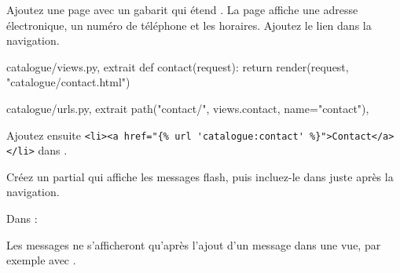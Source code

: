 \begin{exercice}
Ajoutez une page  avec un gabarit qui étend . La
page affiche une adresse électronique, un numéro de téléphone et les horaires.
Ajoutez le lien dans la navigation.
\end{exercice}

\begin{correction}
\begin{codebox}[python]{catalogue/views.py, extrait}
def contact(request):
    return render(request, "catalogue/contact.html")
\end{codebox}

\begin{codebox}[python]{catalogue/urls.py, extrait}
path("contact/", views.contact, name="contact"),
\end{codebox}


Ajoutez ensuite \lstinline|<li><a href="{% url 'catalogue:contact' %}">Contact</a></li>|
dans .
\end{correction}

\begin{exercice}
Créez un partial  qui affiche les messages
flash, puis incluez-le dans  juste après la navigation.
\end{exercice}

\begin{correction}

Dans  :


Les messages ne s'afficheront qu'après l'ajout d'un message dans une vue, par
exemple avec .
\end{correction}

